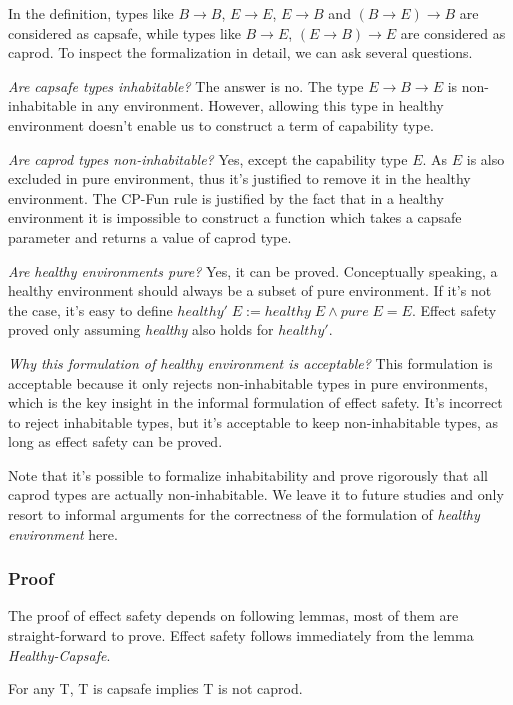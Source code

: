 In the definition, types like $B \to B$, $E \to E$, $E \to B$ and
$(B \to E) \to B$ are considered as capsafe, while types like
$B \to E$, $(E \to B) \to E$ are considered as caprod. To inspect the
formalization in detail, we can ask several questions.

\emph{Are capsafe types inhabitable?} The answer is no. The type
$E \to B \to E$ is non-inhabitable in any environment. However,
allowing this type in healthy environment doesn't enable us to
construct a term of capability type.

\emph{Are caprod types non-inhabitable?} Yes, except the capability
type $E$. As $E$ is also excluded in pure environment, thus it's
justified to remove it in the healthy environment. The CP-Fun rule is
justified by the fact that in a healthy environment it is impossible
to construct a function which takes a capsafe parameter and returns a
value of caprod type.

\emph{Are healthy environments pure?} Yes, it can be
proved. Conceptually speaking, a healthy environment should always be
a subset of pure environment.  If it's not the case, it's easy to
define $healthy' \; E := healthy \; E \wedge pure \; E = E$. Effect safety
proved only assuming \emph{healthy} also holds for $healthy'$.

\emph{Why this formulation of healthy environment is acceptable?} This
formulation is acceptable because it only rejects non-inhabitable
types in pure environments, which is the key insight in the informal
formulation of effect safety. It's incorrect to reject inhabitable
types, but it's acceptable to keep non-inhabitable types, as long as
effect safety can be proved.

Note that it's possible to formalize inhabitability and prove
rigorously that all caprod types are actually non-inhabitable. We
leave it to future studies and only resort to informal arguments for
the correctness of the formulation of \emph{healthy environment} here.

\subsubsection{Proof}

The proof of effect safety depends on following lemmas, most of them
are straight-forward to prove. Effect safety follows immediately from
the lemma \emph{Healthy-Capsafe}.

\begin{lemma}
 For any T, T is capsafe implies T is not caprod.
\end{lemma}

